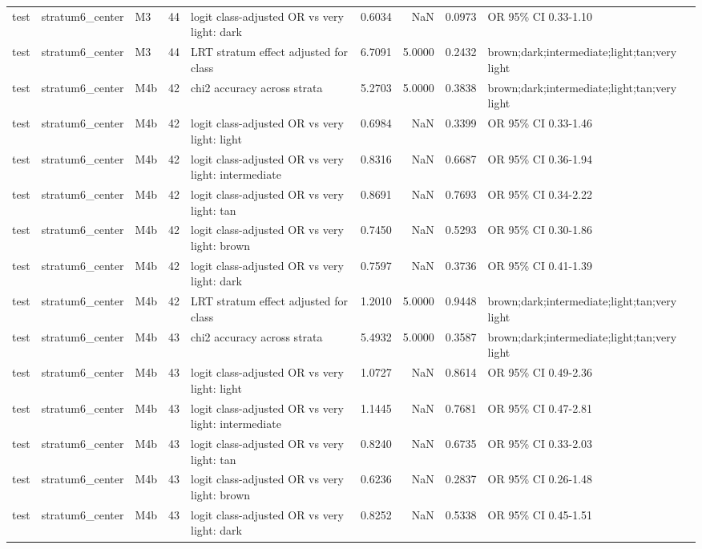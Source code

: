 \begin{tabular}{lllrlrrrl}
test & stratum6\_center & M3 & 44 & logit class-adjusted OR vs very light: dark & 0.6034 & NaN & 0.0973 & OR 95\% CI 0.33-1.10 \\
test & stratum6\_center & M3 & 44 & LRT stratum effect adjusted for class & 6.7091 & 5.0000 & 0.2432 & brown;dark;intermediate;light;tan;very light \\
test & stratum6\_center & M4b & 42 & chi2 accuracy across strata & 5.2703 & 5.0000 & 0.3838 & brown;dark;intermediate;light;tan;very light \\
test & stratum6\_center & M4b & 42 & logit class-adjusted OR vs very light: light & 0.6984 & NaN & 0.3399 & OR 95\% CI 0.33-1.46 \\
test & stratum6\_center & M4b & 42 & logit class-adjusted OR vs very light: intermediate & 0.8316 & NaN & 0.6687 & OR 95\% CI 0.36-1.94 \\
test & stratum6\_center & M4b & 42 & logit class-adjusted OR vs very light: tan & 0.8691 & NaN & 0.7693 & OR 95\% CI 0.34-2.22 \\
test & stratum6\_center & M4b & 42 & logit class-adjusted OR vs very light: brown & 0.7450 & NaN & 0.5293 & OR 95\% CI 0.30-1.86 \\
test & stratum6\_center & M4b & 42 & logit class-adjusted OR vs very light: dark & 0.7597 & NaN & 0.3736 & OR 95\% CI 0.41-1.39 \\
test & stratum6\_center & M4b & 42 & LRT stratum effect adjusted for class & 1.2010 & 5.0000 & 0.9448 & brown;dark;intermediate;light;tan;very light \\
test & stratum6\_center & M4b & 43 & chi2 accuracy across strata & 5.4932 & 5.0000 & 0.3587 & brown;dark;intermediate;light;tan;very light \\
test & stratum6\_center & M4b & 43 & logit class-adjusted OR vs very light: light & 1.0727 & NaN & 0.8614 & OR 95\% CI 0.49-2.36 \\
test & stratum6\_center & M4b & 43 & logit class-adjusted OR vs very light: intermediate & 1.1445 & NaN & 0.7681 & OR 95\% CI 0.47-2.81 \\
test & stratum6\_center & M4b & 43 & logit class-adjusted OR vs very light: tan & 0.8240 & NaN & 0.6735 & OR 95\% CI 0.33-2.03 \\
test & stratum6\_center & M4b & 43 & logit class-adjusted OR vs very light: brown & 0.6236 & NaN & 0.2837 & OR 95\% CI 0.26-1.48 \\
test & stratum6\_center & M4b & 43 & logit class-adjusted OR vs very light: dark & 0.8252 & NaN & 0.5338 & OR 95\% CI 0.45-1.51 \\

\end{tabular}
